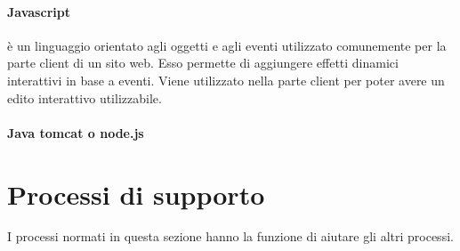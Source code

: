 	\paragraph{Javascript}
	 è un linguaggio orientato agli oggetti e agli eventi utilizzato comunemente per la parte client di un sito web. Esso permette di aggiungere effetti dinamici interattivi in base a eventi.
	Viene utilizzato nella parte client per poter avere un edito interattivo utilizzabile.%
	\paragraph{Java tomcat o node.js}




\section{Processi di supporto}
I processi normati in questa sezione hanno la funzione di aiutare gli altri processi.

